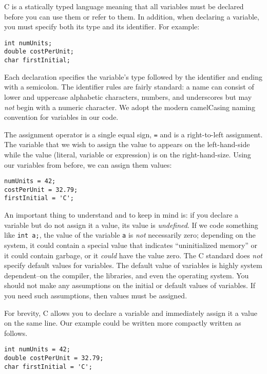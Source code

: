 C is a statically typed language meaning that all variables must be declared
before you can use them or refer to them.  In addition, when declaring a variable, 
you must specify both its type and its identifier.  For example:

\begin{verbatim}
int numUnits;
double costPerUnit;
char firstInitial;
\end{verbatim}

Each declaration specifies the variable's type followed by the identifier and ending
with a semicolon.  The identifier rules are fairly standard: a name can consist
of lower and uppercase alphabetic characters, numbers, and underscores but
may \emph{not} begin with a numeric character.  We adopt the modern camelCasing
naming convention for variables in our code.

The assignment operator is a single equal sign, \texttt{=} and is a right-to-left
assignment.  The variable that we wish to assign the value to appears on the
left-hand-side while the value (literal, variable or expression) is on the right-hand-size.
Using our variables from before, we can assign them values:

\begin{verbatim}
numUnits = 42;
costPerUnit = 32.79;
firstInitial = 'C';
\end{verbatim}

An important thing to understand and to keep in mind is: if you 
declare a variable but do not assign it a value, its value is \emph{undefined}.  
If we code something like \texttt{int a;}, the value
of the variable \texttt{a} is \emph{not} necessarily zero; depending
on the system, it could contain a special value that indicates ``uninitialized
memory'' or it could contain garbage, or it \emph{could} have the value zero.
The C standard does \emph{not} specify default values for variables.  The
default value of variables is highly system dependent--on the compiler, the
libraries, and even the operating system.  You should not make any assumptions on 
the initial or default values of variables.  If you need such assumptions, then 
values must be assigned.

For brevity, C allows you to declare a variable and immediately assign it a value on the same
line.  Our example could be written more compactly written as follows.

\begin{verbatim}
int numUnits = 42;
double costPerUnit = 32.79;
char firstInitial = 'C';
\end{verbatim}

